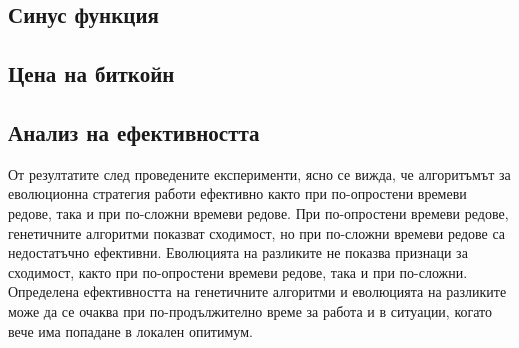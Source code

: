 \subsection{Синус функция}

\subsection{Цена на биткойн}

\subsection{Анализ на ефективността}

От резултатите след проведените експерименти, ясно се вижда, че алгоритъмът за еволюционна стратегия работи ефективно както при по-опростени времеви редове, така и при по-сложни времеви редове. При по-опростени времеви редове, генетичните алгоритми показват сходимост, но при по-сложни времеви редове са недостатъчно ефективни. Еволюцията на разликите не показва признаци за сходимост, както при по-опростени времеви редове, така и при по-сложни. Определена ефективността на генетичните алгоритми и еволюцията на разликите може да се очаква при по-продължително време за работа и в ситуации, когато вече има попадане в локален опитимум. 

